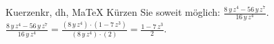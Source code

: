 \begin{MAufgabe}{Kuerzen}{kr, dh, MaTeX}
K\"urzen Sie soweit m\"oglich: $\frac{8\, y\, z^4 - 56\, y\, z^7}{16\, y\, z^4}$.\\ 
\ifLsg\MLoesung
\quad $\frac{8\, y\, z^4 - 56\, y\, z^7}{16\, y\, z^4}=\frac{(8\, y\, z^4)\cdot(1 - 7\, z^3)}{(8\, y\, z^4)\cdot(2)}=\frac{1 - 7\, z^3}{2}$.\else\relax\fi
 \end{MAufgabe}